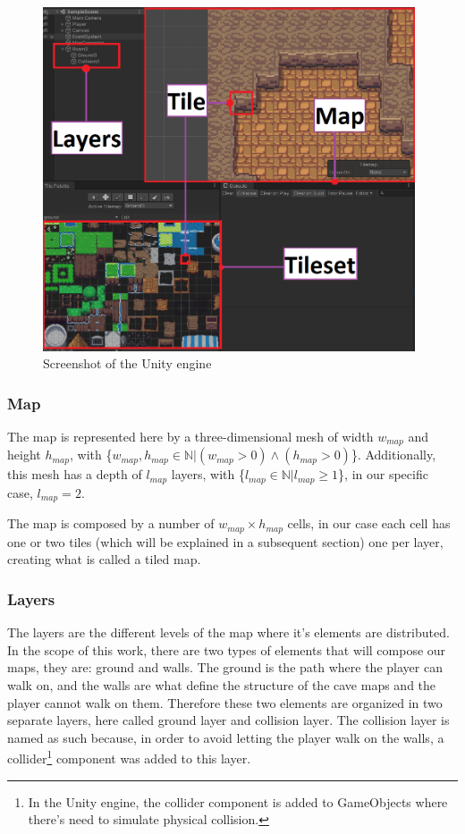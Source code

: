 \begin{figure}[h]
    \caption{Screenshot of the Unity engine}
    \centerline{\includegraphics[width=11cm]{images/proposal/unity_print.png}}
    \label{fig:unity_print}
\end{figure}

\subsubsection{Map}
The map is represented here by a three-dimensional mesh of width \(w_{map}\) and height \(h_{map}\), with \{\(w_{map}, h_{map} \in \mathbb{N}|(w_{map}>0)\wedge(h_{map}>0)\)\}. Additionally, this mesh has a depth of \(l_{map}\) layers, with \{\(l_{map} \in \mathbb{N}|l_{map}\geq 1\)\}, in our specific case, \(l_{map} = 2\).

The map is composed by a number of \(w_{map} \times h_{map}\) cells, in our case each cell has one or two tiles (which will be explained in a subsequent section) one per layer, creating what is called a tiled map. 

\subsubsection{Layers}
The layers are the different levels of the map where it's elements are distributed. In the scope of this work, there are two types of elements that will compose our maps, they are: ground and walls. The ground is the path where the player can walk on, and the walls are what define the structure of the cave maps and the player cannot walk on them. Therefore these two elements are organized in two separate layers, here called ground layer and collision layer. The collision layer is named as such because, in order to avoid letting the player walk on the walls, a collider\footnote{In the Unity engine, the collider component is added to GameObjects where there's need to simulate physical collision.} component was added to this layer.

